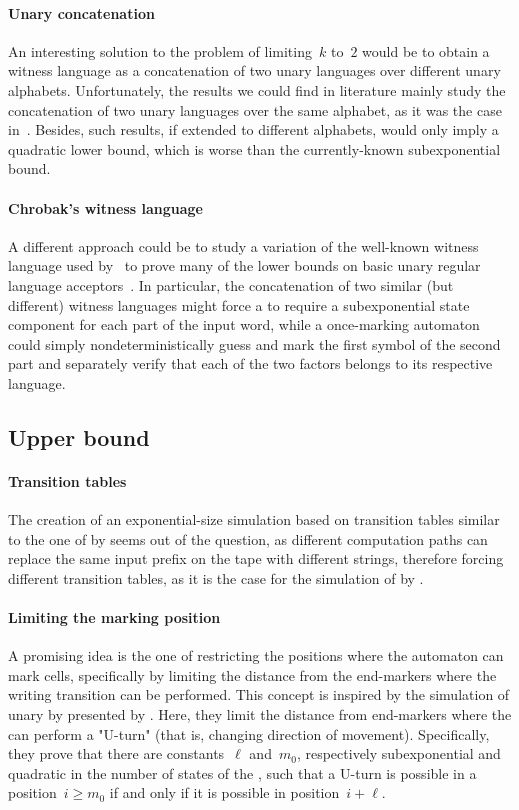\paragraph{Unary concatenation} An interesting solution to the problem of limiting~$k$ to~$2$ would be to obtain a witness language as a concatenation of two unary languages over different unary alphabets.
Unfortunately, the results we could find in literature mainly study the concatenation of two unary languages over the same alphabet, as it was the case in~\cite{YuZhu+94,PigSha02}.
Besides, such results, if extended to different alphabets, would only imply a quadratic lower bound, which is worse than the currently-known subexponential bound.

\paragraph{Chrobak's witness language} A different approach could be to study a variation of the well-known witness language used by~\citeauthor{Chr86} to prove many of the lower bounds on basic unary regular language acceptors~\cite{Chr86}.
In particular, the concatenation of two similar (but different) witness languages might force a \ODFA to require a subexponential state component for each part of the input word, while a once-marking automaton could simply nondeterministically guess and mark the first symbol of the second part and separately verify that each of the two factors belongs to its respective language.


\subsection{Upper bound}

\paragraph{Transition tables} The creation of an exponential-size simulation based on transition tables similar to the one of \TNFAs by \ODFAs seems out of the question, as different computation paths can replace the same input prefix on the tape with different strings, therefore forcing different transition tables, as it is the case for the simulation of \OLAs by \ODFAs.

\paragraph{Limiting the marking position} A promising idea is the one of restricting the positions where the automaton can mark cells, specifically by limiting the distance from the end-markers where the writing transition can be performed.
This concept is inspired by the simulation of unary \TNFAs by \ODFAs presented by .
Here, they limit the distance from end-markers where the \TNFA can perform a "U-turn" (that is, changing direction of movement).
Specifically, they prove that there are constants~$\ell$ and~$m_0$, respectively subexponential and quadratic in the number of states of the \TNFA, such that a U-turn is possible in a position~$i\ge m_0$ if and only if it is possible in position~$i+\ell$.

